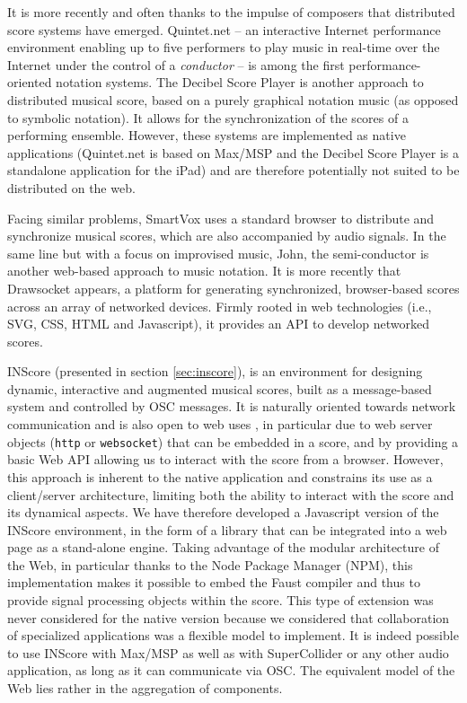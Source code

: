\documentclass{article}
\newcommand{\icode}[1]	{{\small \texttt{#1}}}
\begin{document}
It is more recently and often thanks to the impulse of composers that distributed score systems have emerged.
Quintet.net \cite{doi:10.1162/leon.2005.38.1.23} -- an interactive Internet performance environment enabling up to five performers to play music in real-time over the Internet under the control of a \emph{conductor} -- is among the first performance-oriented notation systems. 
The Decibel Score Player \cite{cat_hope_2015_1289610} is another approach to distributed musical score, based on a purely graphical notation music (as opposed to symbolic notation). It allows for the synchronization of the scores of a performing ensemble.
However, these systems are implemented as native applications (Quintet.net is based on Max/MSP and the Decibel Score Player is a standalone application for the iPad) and are therefore potentially not suited to be distributed on the web.

Facing similar problems, SmartVox \cite{bell:hal-01660184} uses a standard browser to distribute and synchronize musical scores, which are also accompanied by audio signals. In the same line but with a focus on improvised music, John, the semi-conductor \cite{goudard:hal-01923258} is another web-based approach to music notation.
It is more recently that Drawsocket \cite{rama_gottfried_2019_3373369} appears, a platform for generating synchronized, browser-based scores across an array of networked devices. Firmly rooted in web technologies (i.e., SVG, CSS, HTML and Javascript), it provides an API to develop networked scores.

INScore \cite{fober:hal-02158817} (presented in section \ref{sec:inscore}), is an environment for designing dynamic, interactive and augmented musical scores, built as a message-based system and controlled by OSC messages. It is naturally oriented towards network communication and is also open to web uses \cite{fober:hal-01348511}, in particular due to web server objects (\icode{http} or \icode{websocket}) that can be embedded in a score, and by providing a basic Web API allowing us to interact with the score from a browser. 
However, this approach is inherent to the native application and constrains its use as a client/server architecture, limiting both the ability to interact with the score and its dynamical aspects. 
We have therefore developed a Javascript version of the INScore environment, in the form of a library that can be integrated into a web page as a stand-alone engine. 
Taking advantage of the modular architecture of the Web, in particular thanks to the Node Package Manager (NPM), this implementation makes it possible to embed the Faust compiler \cite{orlarey:hal-02159014} \cite{ren:hal-03087763} and thus to provide signal processing objects within the score. 
This type of extension was never considered for the native version because we considered that collaboration of specialized applications was a flexible model to implement. It is indeed possible to use INScore with Max/MSP as well as with SuperCollider or any other audio application, as long as it can communicate via OSC. 
The equivalent model of the Web lies rather in the aggregation of components.
\end{document}

